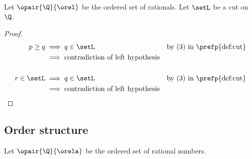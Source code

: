 \begin{lemma}
Let $\opair{\Q}{\orel}$ be the ordered set of rationals.
Let $\setL$ be a cut on $\Q$.
\end{lemma}
\begin{proof}
\begin{align*}
  p\ge q
    &\implies q\in\setL
    && \text{by (3) in \prefp{def:cut}}
  \\&\implies \text{contradiction of left hypothesis}
  \\
  \\
  r\in\setL
    &\implies q\in\setL
    && \text{by (3) in \prefp{def:cut}}
  \\&\implies \text{contradiction of left hypothesis}
\end{align*}
\end{proof}


\begin{definition}
\label{def:R}
\end{definition}



\subsection{Order structure}
\begin{definition}
\label{def:R_orderrel}
Let $\opair{\Q}{\orela}$ be the ordered set of rational numbers.
\end{definition}

